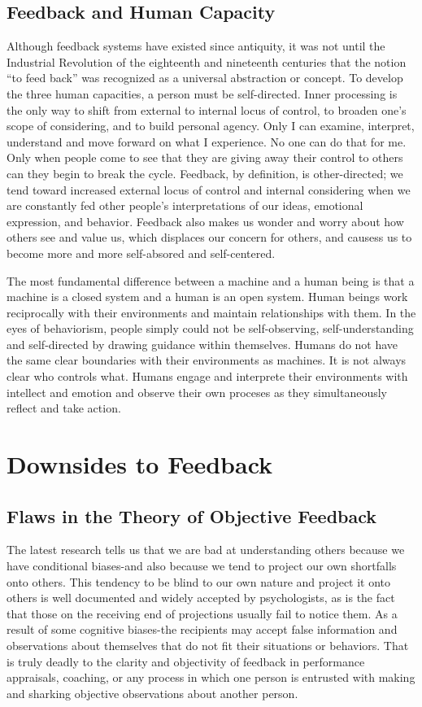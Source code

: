 \documentclass[ebook,12pt,oneside,openany]{memoir}
\begin{document}
\subsection{Feedback and Human Capacity}
Although feedback systems have existed since antiquity, it was not until the Industrial Revolution of the eighteenth and nineteenth centuries that the notion ``to feed back'' was recognized as a universal abstraction or concept.
To develop the three human capacities, a person must be self-directed. Inner processing is the only way to shift from external to internal locus of control, to broaden one's scope of considering, and to build personal agency.
Only I can examine, interpret, understand and move forward on what I experience.
No one can do that for me. Only when people come to see that they are giving away their control to others can they begin to break the cycle.
Feedback, by definition, is other-directed; we tend toward increased external locus of control and internal considering when we are constantly fed other people's interpretations of our ideas, emotional expression, and behavior.
Feedback also makes us wonder and worry about how others see and value us, which displaces our concern for others, and causess us to become more and more self-absored and self-centered.

The most fundamental difference between a machine and a human being is that a machine is a closed system and a human is an open system. Human beings work reciprocally with their environments and maintain relationships with them. 
In the eyes of behaviorism, people simply could not be self-observing, self-understanding and self-directed by drawing guidance within themselves.
Humans do not have the same clear boundaries with their environments as machines. It is not always clear who controls what. Humans engage and interprete their environments with intellect and emotion and observe their own proceses as they simultaneously reflect and take action.

\section{Downsides to Feedback}
\subsection{Flaws in the Theory of Objective Feedback}
The latest research tells us that we are bad at understanding others because we have conditional biases-and also because we tend to project our own shortfalls onto others.
This tendency to be blind to our own nature and project it onto others is well documented and widely accepted by psychologists, as is the fact that those on the receiving end of projections usually fail to notice them.
As a result of some cognitive biases-the recipients may accept false information and observations about themselves that do not fit their situations or behaviors.
That is truly deadly to the clarity and objectivity of feedback in performance appraisals, coaching, or any process in which one person is entrusted with making and sharking objective observations about another person.
\end{document}

